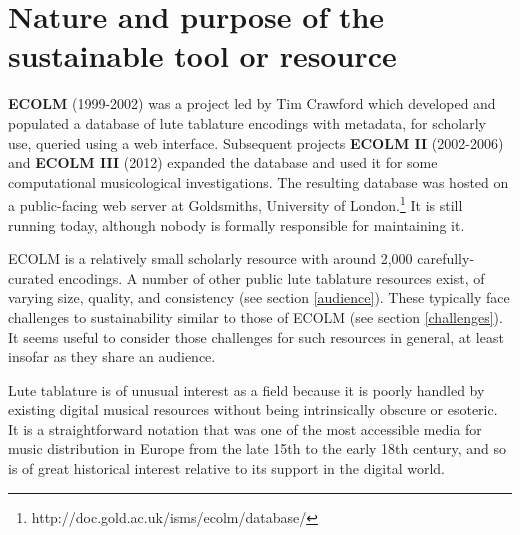 \documentclass[sigconf, nonacm=true]{acmart}
\begin{document}
\maketitle
\begin{sloppypar}


  \section{Nature and purpose of the sustainable tool or resource}

  {\bf ECOLM} (1999-2002) was a project led by Tim Crawford which
  developed and populated a database of lute tablature encodings with
  metadata, for scholarly use, queried using a web
  interface. Subsequent projects {\bf ECOLM II} (2002-2006) and {\bf
    ECOLM III} (2012) expanded the database and used it for some
  computational musicological investigations. The resulting database
  was hosted on a public-facing web server at Goldsmiths, University
  of London.\footnote{http://doc.gold.ac.uk/isms/ecolm/database/} It
  is still running today, although nobody is formally responsible for
  maintaining it.

  ECOLM is a relatively small scholarly resource with around 2,000
  carefully-curated encodings. A number of other public lute tablature
  resources exist, of varying size, quality, and consistency (see
  section \ref{audience}). These typically face challenges to
  sustainability similar to those of ECOLM (see section
  \ref{challenges}). It seems useful to consider those challenges for
  such resources in general, at least insofar as they share an
  audience.

  Lute tablature is of unusual interest as a field because it is
  poorly handled by existing digital musical resources without being
  intrinsically obscure or esoteric. It is a straightforward notation
  that was one of the most accessible media for music distribution in
  Europe from the late 15th to the early 18th century, and so is of
  great historical interest relative to its support in the digital
  world.
  

\end{sloppypar}
\end{document}
